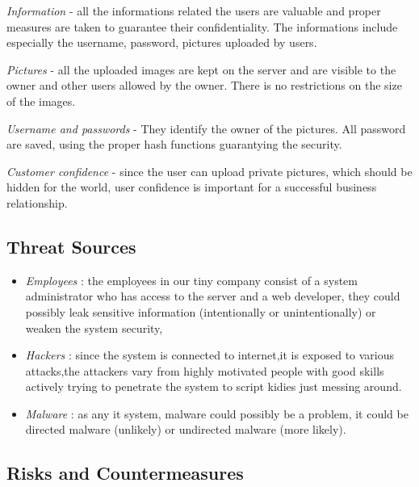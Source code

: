\textit{Information} - all the informations related the users are valuable and proper measures are taken to guarantee their confidentiality. The informations include especially the username, password, pictures uploaded by users. 


\textit{Pictures} - all the uploaded images are kept on the server and are visible to the owner and other users allowed by the owner. There is no restrictions on the size of the images.


\textit{Username and passwords} - They identify the owner of the pictures. All password are saved, using the proper hash functions guarantying the security. 


\textit{Customer confidence} - since the user can upload private pictures, which should be hidden for the world, user confidence is important for a successful business relationship.

\subsection{Threat Sources}



\begin{itemize}
  \item \textit{Employees} : the employees in our tiny company consist of a system administrator who has access to the server and a web developer, they could possibly leak sensitive information (intentionally or unintentionally) or weaken the system security, 
  \item \textit{Hackers} : since the system is connected to internet,it is exposed to various attacks,the attackers vary from highly motivated people with good skills actively trying to penetrate the system to script kidies just messing around.
  \item \textit{Malware} : as any it system, malware could possibly be a problem, it could be directed malware (unlikely) or undirected malware (more likely).
\end{itemize}



\subsection{Risks and Countermeasures}


